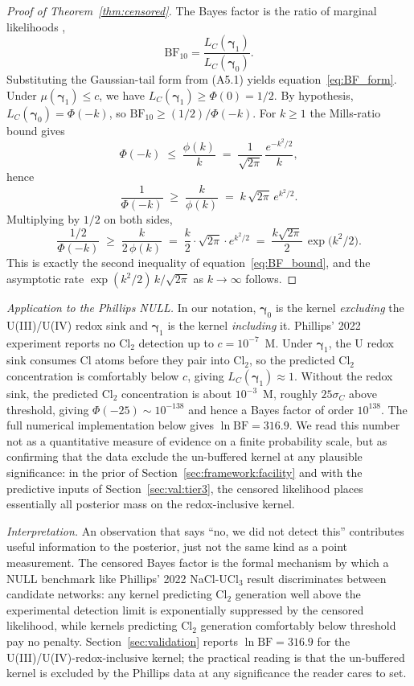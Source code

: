 \documentclass[12pt]{article}
\theoremstyle{plain}
\theoremstyle{definition}
\theoremstyle{remark}
\begin{document}
\begin{proof}[Proof of Theorem~\ref{thm:censored}]
The Bayes factor is the ratio of marginal likelihoods
\citep[\S 4]{Kass1995},
\[
  \mathrm{BF}_{10}
  = \frac{L_C(\boldsymbol\gamma_1)}{L_C(\boldsymbol\gamma_0)} .
\]
Substituting the Gaussian-tail form from (A5.1) yields
equation~\eqref{eq:BF_form}.  Under $\mu(\boldsymbol\gamma_1)\le c$, we have
$L_C(\boldsymbol\gamma_1)\ge\Phi(0)=1/2$.  By hypothesis,
$L_C(\boldsymbol\gamma_0)=\Phi(-k)$, so $\mathrm{BF}_{10}\ge(1/2)/\Phi(-k)$.
For $k\ge 1$ the Mills-ratio bound
\citep[26.2.12]{Abramowitz1972} gives
\[
  \Phi(-k)\;\le\;\frac{\phi(k)}{k}
   \;=\;\frac{1}{\sqrt{2\pi}}\,\frac{e^{-k^2/2}}{k},
\]
hence
\[
  \frac{1}{\Phi(-k)}\;\ge\;\frac{k}{\phi(k)}
   \;=\;k\,\sqrt{2\pi}\,e^{k^2/2}.
\]
Multiplying by $1/2$ on both sides,
\[
   \frac{1/2}{\Phi(-k)}
    \;\ge\;\frac{k}{2\,\phi(k)}
    \;=\;\frac{k}{2}\cdot\sqrt{2\pi}\cdot e^{k^2/2}
    \;=\;\frac{k\sqrt{2\pi}}{2}\,\exp\!\bigl(k^2/2\bigr).
\]
This is exactly the second inequality of equation~\eqref{eq:BF_bound}, and
the asymptotic rate $\exp(k^2/2)\,k/\sqrt{2\pi}$ as $k\to\infty$ follows.
\end{proof}

\begin{sloppypar}
\emph{Application to the Phillips NULL.}  In our notation,
$\boldsymbol\gamma_0$ is the kernel \emph{excluding} the U(III)/U(IV)
redox sink and $\boldsymbol\gamma_1$ is the kernel \emph{including}
it.  Phillips' 2022 experiment reports no Cl$_2$ detection up to
$c=10^{-7}$~M.  Under $\boldsymbol\gamma_1$, the U redox sink
consumes Cl atoms before they pair into Cl$_2$, so the predicted
Cl$_2$ concentration is comfortably below $c$, giving
$L_C(\boldsymbol\gamma_1)\approx 1$.  Without the redox sink, the predicted
Cl$_2$ concentration is about $10^{-3}$~M, roughly $25\sigma_C$ above
threshold, giving
$\Phi(-25)\sim 10^{-138}$ and hence a Bayes factor of order $10^{138}$.
The full numerical implementation below gives
$\ln\mathrm{BF}=316.9$.  We read this number not as a quantitative
measure of evidence on a finite probability scale, but as confirming that
the data exclude the un-buffered kernel at any plausible significance: in
the prior of Section~\ref{sec:framework:facility} and with the predictive
inputs of Section~\ref{sec:val:tier3}, the censored likelihood places
essentially all posterior mass on the redox-inclusive kernel.
\end{sloppypar}

\emph{Interpretation.}  An observation that says ``no, we did not
detect this'' contributes useful information to the posterior, just
not the same kind as a point measurement.  The censored Bayes factor
is the formal mechanism by which a NULL benchmark like Phillips' 2022
\mbox{NaCl-UCl$_3$} result discriminates between candidate networks:
any kernel predicting Cl$_2$ generation well above the experimental
detection limit is exponentially suppressed by the censored
likelihood, while kernels predicting Cl$_2$ generation comfortably
below threshold pay no penalty.  Section~\ref{sec:validation} reports
$\ln\mathrm{BF}=316.9$ for the U(III)/U(IV)-redox-inclusive kernel;
the practical reading is that the un-buffered kernel is excluded by the
Phillips data at any significance the reader cares to set.
\end{document}
